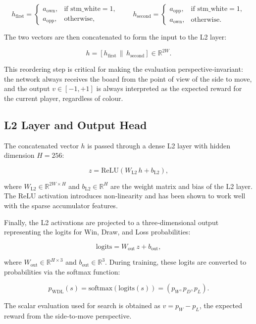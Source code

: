\[
h_{\text{first}} =
\begin{cases}
a_{\text{own}}, & \text{if } \text{stm\_white} = 1, \\
a_{\text{opp}}, & \text{otherwise},
\end{cases}
\qquad
h_{\text{second}} =
\begin{cases}
a_{\text{opp}}, & \text{if } \text{stm\_white} = 1, \\
a_{\text{own}}, & \text{otherwise}.
\end{cases}
\]

The two vectors are then concatenated to form the input to the L2 layer:

\[
h = [h_{\text{first}} \, \| \, h_{\text{second}}] \in \mathbb{R}^{2W}.
\]

This reordering step is critical for making the evaluation perspective‑invariant: the network always receives the board from the point of view of the side to move, and the output $v \in [-1, +1]$ is always interpreted as the expected reward for the current player, regardless of colour.

\subsection{L2 Layer and Output Head}

The concatenated vector $h$ is passed through a dense L2 layer with hidden dimension $H = 256$:

\[
z = \text{ReLU}(W_{\text{L2}} \, h + b_{\text{L2}}),
\]

where $W_{\text{L2}} \in \mathbb{R}^{2W \times H}$ and $b_{\text{L2}} \in \mathbb{R}^H$ are the weight matrix and bias of the L2 layer. The ReLU activation introduces non‑linearity and has been shown to work well with the sparse accumulator features.

Finally, the L2 activations are projected to a three‑dimensional output representing the logits for Win, Draw, and Loss probabilities:

\[
\text{logits} = W_{\text{out}} \, z + b_{\text{out}},
\]

where $W_{\text{out}} \in \mathbb{R}^{H \times 3}$ and $b_{\text{out}} \in \mathbb{R}^3$. During training, these logits are converted to probabilities via the softmax function:

\[
p_{\text{WDL}}(s) = \text{softmax}(\text{logits}(s)) = (p_W, p_D, p_L).
\]

The scalar evaluation used for search is obtained as $v = p_W - p_L$, the expected reward from the side‑to‑move perspective.

